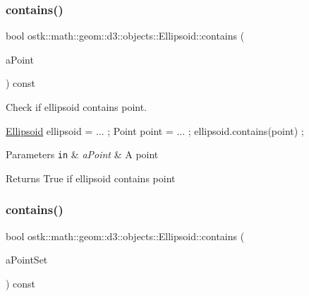 \subsubsection{\texorpdfstring{contains()}{contains()}\hspace{0.1cm}{\footnotesize\ttfamily [1/3]}}
{\footnotesize\ttfamily bool ostk\+::math\+::geom\+::d3\+::objects\+::\+Ellipsoid\+::contains (\begin{DoxyParamCaption}\item[{const \hyperlink{classostk_1_1math_1_1geom_1_1d3_1_1objects_1_1_point}{Point} \&}]{a\+Point }\end{DoxyParamCaption}) const}



Check if ellipsoid contains point. 


\begin{DoxyCode}
\hyperlink{classostk_1_1math_1_1geom_1_1d3_1_1objects_1_1_ellipsoid_a106c71abf9503f3d06b2613c1c7e9d65}{Ellipsoid} ellipsoid = ... ;
Point point = ... ;
ellipsoid.contains(point) ;
\end{DoxyCode}



\begin{DoxyParams}[1]{Parameters}
\mbox{\tt in}  & {\em a\+Point} & A point \\
\hline
\end{DoxyParams}
\begin{DoxyReturn}{Returns}
True if ellipsoid contains point 
\end{DoxyReturn}
\mbox{\label{classostk_1_1math_1_1geom_1_1d3_1_1objects_1_1_ellipsoid_a9e0b0c5c2db95f53da783ccfea36de17}} 
\subsubsection{\texorpdfstring{contains()}{contains()}\hspace{0.1cm}{\footnotesize\ttfamily [2/3]}}
{\footnotesize\ttfamily bool ostk\+::math\+::geom\+::d3\+::objects\+::\+Ellipsoid\+::contains (\begin{DoxyParamCaption}\item[{const \hyperlink{classostk_1_1math_1_1geom_1_1d3_1_1objects_1_1_point_set}{Point\+Set} \&}]{a\+Point\+Set }\end{DoxyParamCaption}) const}



